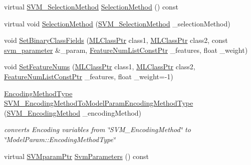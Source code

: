 \begin{DoxyCompactItemize}
\item 
virtual \hyperlink{namespace_k_k_m_l_l_afab7be632987641e5805e770be7f6bf8}{S\+V\+M\+\_\+\+Selection\+Method} \hyperlink{class_k_k_m_l_l_1_1_model_param_old_s_v_m_a89921b741a89dc09888563833c2d952d}{Selection\+Method} () const 
\item 
virtual void \hyperlink{class_k_k_m_l_l_1_1_model_param_old_s_v_m_ad30fd854501797ac844d1e31260b66e0}{Selection\+Method} (\hyperlink{namespace_k_k_m_l_l_afab7be632987641e5805e770be7f6bf8}{S\+V\+M\+\_\+\+Selection\+Method} \+\_\+selection\+Method)
\item 
void \hyperlink{class_k_k_m_l_l_1_1_model_param_old_s_v_m_a5307c3a5a69cf5ca2b86b4d6c3c71158}{Set\+Binary\+Class\+Fields} (\hyperlink{namespace_k_k_m_l_l_ac272393853d59e72e8456f14cd6d8c23}{M\+L\+Class\+Ptr} class1, \hyperlink{namespace_k_k_m_l_l_ac272393853d59e72e8456f14cd6d8c23}{M\+L\+Class\+Ptr} class2, const \hyperlink{class_k_k_m_l_l_1_1_model_param_old_s_v_m_ae96c3ff03f4145985df9225fdea5aa54}{svm\+\_\+parameter} \&\+\_\+param, \hyperlink{namespace_k_k_m_l_l_a81284b0a14973267260023f9a72da94a}{Feature\+Num\+List\+Const\+Ptr} \+\_\+features, float \+\_\+weight)
\item 
void \hyperlink{class_k_k_m_l_l_1_1_model_param_old_s_v_m_a8ff40a557733f55512b7b0ddd8dd64ad}{Set\+Feature\+Nums} (\hyperlink{namespace_k_k_m_l_l_ac272393853d59e72e8456f14cd6d8c23}{M\+L\+Class\+Ptr} class1, \hyperlink{namespace_k_k_m_l_l_ac272393853d59e72e8456f14cd6d8c23}{M\+L\+Class\+Ptr} class2, \hyperlink{namespace_k_k_m_l_l_a81284b0a14973267260023f9a72da94a}{Feature\+Num\+List\+Const\+Ptr} \+\_\+features, float \+\_\+weight=-\/1)
\item 
\hyperlink{class_k_k_m_l_l_1_1_model_param_a09e49f936f411dba6f08bdaf8d6b4a98}{Encoding\+Method\+Type} \hyperlink{class_k_k_m_l_l_1_1_model_param_old_s_v_m_af05d28eed5dd20b40987266997285dad}{S\+V\+M\+\_\+\+Encoding\+Method\+To\+Model\+Param\+Encoding\+Method\+Type} (\hyperlink{namespace_k_k_m_l_l_a1994af1d94ca5bf6e27f0cf803a8d64c}{S\+V\+M\+\_\+\+Encoding\+Method} \+\_\+encoding\+Method)
\begin{DoxyCompactList}\small\item\em converts Encoding variables from \char`\"{}\+S\+V\+M\+\_\+\+Encoding\+Method\char`\"{} to \char`\"{}\+Model\+Param\+::\+Encoding\+Method\+Type\char`\"{} \end{DoxyCompactList}\item 
virtual \hyperlink{namespace_k_k_m_l_l_a54fe1e609c2f04a7f05181a535bf4f92}{S\+V\+Mparam\+Ptr} \hyperlink{class_k_k_m_l_l_1_1_model_param_old_s_v_m_ab825a03f88d332d83f37f6a3566215a1}{Svm\+Parameters} () const 

\end{DoxyCompactItemize}
